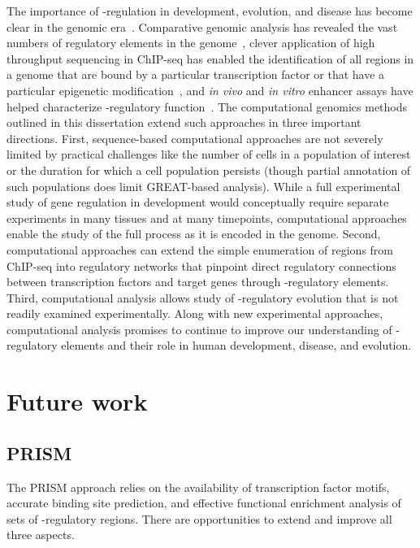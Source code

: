 The importance of \cis-regulation in development, evolution, and disease has become clear
in the genomic era~\citep{Chan2010,Hindorff2009,Lettice2003,McLean2011}.  Comparative genomic analysis has revealed the vast numbers of regulatory
elements in the genome~\citep{Bejerano2004,Siepel2005}, clever application of high throughput sequencing in ChIP-seq
has enabled the identification of all regions in a genome that are bound
by a particular transcription factor or that have a particular epigenetic modification~\citep{Park2009}, and
\textit{in vivo} and \textit{in vitro} enhancer assays have helped characterize \cis-regulatory
function~\citep{Pennacchio2006}.  The computational genomics methods outlined in this dissertation extend such approaches in three important directions.
First, sequence-based computational approaches are not severely limited by practical challenges
like the number of cells in a population of interest or the duration for which a cell population
persists (though partial annotation of such populations does limit GREAT-based analysis).  While a full experimental study of gene regulation in development
would conceptually require separate experiments in many tissues and at many timepoints, computational
approaches enable the study of the full process as it is encoded in the genome.  Second, computational
approaches can extend the simple enumeration of regions from ChIP-seq into regulatory networks
that pinpoint direct regulatory connections between transcription factors and target genes through
\cis-regulatory elements.  Third, computational analysis allows study of \cis-regulatory evolution
that is not readily examined experimentally.  Along with new experimental approaches,
computational analysis promises to continue to improve our understanding of \cis-regulatory elements
and their role in human development, disease, and evolution.

\section{Future work}
\subsection{PRISM}
The PRISM approach relies on the availability of transcription factor motifs, accurate binding site prediction,
and effective functional enrichment analysis of sets of \cis-regulatory regions.  There are opportunities
to extend and improve all three aspects.

